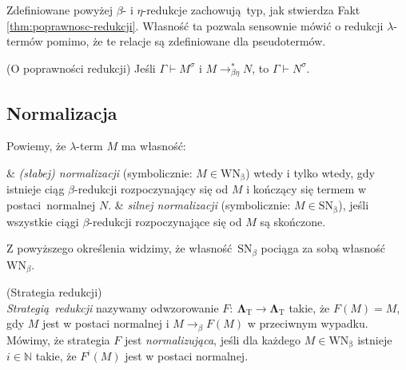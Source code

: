 Zdefiniowane powyżej  \(\beta\)- i \(\eta\)-redukcje zachowują typ, jak stwierdza Fakt \ref{thm:poprawnosc-redukcji}. Własność ta pozwala sensownie mówić o redukcji \(\lambda\)-termów pomimo, że te relacje są zdefiniowane dla pseudotermów. 
\begin{fakt}\label{thm:poprawnosc-redukcji}(O poprawności redukcji) 
  Jeśli \(\Gamma\vdash M^\sigma\) i \(M\longrightarrow^{*}_{\beta\eta}N\), to
  \(\Gamma\vdash N^\sigma\).
\end{fakt}
\subsection{Normalizacja}
\noindent Powiemy, że \(\lambda\)-term \(M\) ma własność:
\begin{easylist}
  & \emph{(słabej) normalizacji} (symbolicznie: \(M\in\mathrm{WN_{\beta}}\)) wtedy i tylko wtedy, gdy istnieje ciąg \(\beta\)-redukcji rozpoczynający się od \(M\) i kończący się termem w postaci normalnej \(N\). 
  &  \emph{silnej normalizacji} (symbolicznie: \(M\in\mathrm{SN_{\beta}}\)), jeśli wszystkie ciągi \(\beta\)-redukcji rozpoczynające się od \(M\) są skończone.
\end{easylist}
\begin{uwaga*}
Z powyższego określenia  widzimy, że własność \(\mathrm{SN}_{\beta}\) pociąga za sobą własność \(\mathrm{WN}_{\beta}\).
\end{uwaga*}
\begin{definicja}(Strategia redukcji)\\
  \emph{Strategią redukcji} nazywamy odwzorowanie \(F:\:\mathbf{\Lambda}_{\mathrm{T}}\longrightarrow\mathbf{\Lambda}_{\mathrm{T}}\) takie, że \(F(M)=M\), gdy \(M\) jest w postaci normalnej i \(M\longrightarrow_{\beta}F(M)\) w przeciwnym wypadku. Mówimy, że strategia \(F\) jest \emph{normalizująca}, jeśli dla każdego \(M\in \mathrm{WN_\beta}\) istnieje \(i\in\mathbb{N}\) takie, że \(F^i (M)\) jest w postaci normalnej.
\end{definicja}

